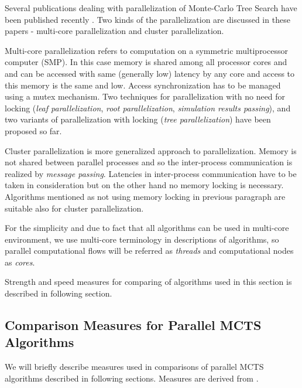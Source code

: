 Several publications dealing with parallelization of Monte-Carlo Tree Search have been published
recently \cites{Cazenave2007}{Chaslot2008}{Teytaud2008}. Two kinds of the parallelization are
discussed in these papers - multi-core parallelization and cluster parallelization.

Multi-core parallelization refers to computation on a symmetric multiprocessor computer (SMP). In
this case memory is shared among all processor cores and and can be accessed with same
(generally low) latency by any core  and access to this memory is the same and low.
Access synchronization has to be managed using a mutex mechanism. Two techniques for
parallelization with no need for locking (\emph{leaf parallelization}, \emph{root parallelization},
\emph{simulation results passing}),
and two variants of parallelization with locking (\emph{tree parallelization}) have been proposed so
far. 

Cluster parallelization is more generalized approach to parallelization. Memory is not shared
between parallel processes and so the inter-process communication is realized by \emph{message
passing}. Latencies in inter-process communication have to be taken in consideration but on the
other hand no memory locking is necessary. Algorithms mentioned as not using memory locking in
previous paragraph are suitable also for cluster parallelization.

For the simplicity and due to fact that all algorithms can be used in multi-core environment, we 
use multi-core terminology in descriptions of algorithms, so parallel
computational flows will be referred as \emph{threads} and computational nodes as \emph{cores}.

Strength and speed measures for comparing of algorithms used in this section is described in
following section.

\subsection{Comparison Measures for Parallel MCTS Algorithms}
\label{sec_measures_parallel}

We will briefly describe measures used in comparisons of parallel MCTS algorithms described in
following sections. Measures are derived from \cite{Chaslot2008}.

